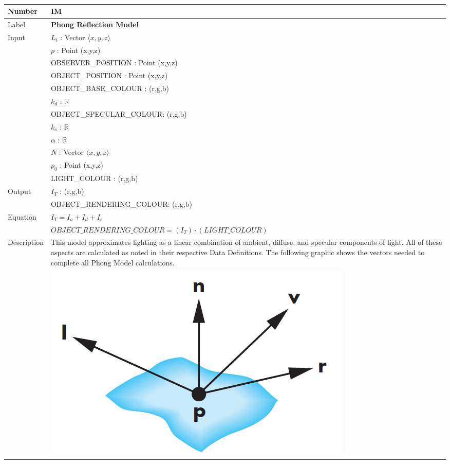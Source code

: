 \documentclass[12pt]{article}
\newcommand{\colAwidth}{0.13\textwidth}
\newcommand{\colBwidth}{0.82\textwidth}
\newcounter{instnum} %
\begin{document}
~\newline

\noindent
\begin{minipage}{\textwidth}
	\renewcommand*{\arraystretch}{1.5}
	\begin{tabular}{| p{\colAwidth} | p{\colBwidth}|}
		\hline
		\rowcolor[gray]{0.9}
		Number& IM{instnum}\theinstnum \label{IM_Phong}\\
		\hline
		Label& \bf Phong Reflection Model\\
		\hline
		\multirow{12}{*}{Input} & $L_{i}$ : Vector $\langle x, y ,z \rangle$\\
		& $p$ : Point (x,y,z)\\
		& OBSERVER\_POSITION : Point (x,y,z)\\		
		& OBJECT\_POSITION : Point (x,y,z)\\
		& OBJECT\_BASE\_COLOUR : (r,g,b)\\
		& $k_{d}$ : $\mathbb{R}$\\
		& OBJECT\_SPECULAR\_COLOUR: (r,g,b)\\
		& $k_{s}$ : $\mathbb{R}$ \\
		& $\alpha$ : $\mathbb{R}$ \\
		& $N$ : Vector $\langle x, y ,z \rangle$\\
		& $p_{0}$ : Point (x,y,z)\\		
		& LIGHT\_COLOUR : (r,g,b)\\	
		\hline
		\multirow{2}{*}{Output} & $I_{T}$ : (r,g,b)\\
		& OBJECT\_RENDERING\_COLOUR: (r,g,b)\\
		\hline
		Equation & $I_{T} = I_{a} + I_{d} + I_{s}$\\
		& $OBJECT\_RENDERING\_COLOUR = (I_{T})\cdot(LIGHT\_COLOUR)$\\
		\hline
		Description& This model approximates lighting as a linear combination 
		of ambient, diffuse, and specular components of light. All of these 
		aspects are calculated as noted in their respective Data Definitions. 
		The following graphic shows the vectors needed to complete all Phong 
		Model calculations.\\
		& \includegraphics[scale=0.4]{./images/phong-reflection-model-vectors}\\

\end{tabular}
\end{minipage}
\end{document}
